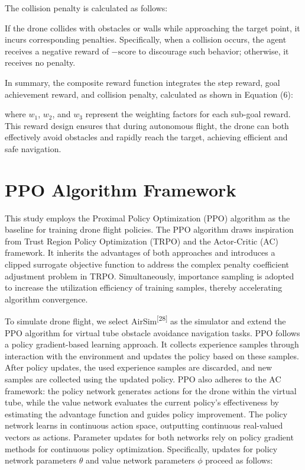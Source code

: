 \documentclass{aas}
\begin{document}
The collision penalty is calculated as follows:


If the drone collides with obstacles or walls while approaching the target point, it incurs corresponding penalties. Specifically, when a collision occurs, the agent receives a negative reward of \(-\text{score}\) to discourage such behavior; otherwise, it receives no penalty.

In summary, the composite reward function integrates the step reward, goal achievement reward, and collision penalty, calculated as shown in Equation (6):


where \( w_1 \), \( w_2 \), and \( w_3 \) represent the weighting factors for each sub-goal reward. This reward design ensures that during autonomous flight, the drone can both effectively avoid obstacles and rapidly reach the target, achieving efficient and safe navigation.

\section{PPO Algorithm Framework}

This study employs the Proximal Policy Optimization (PPO) algorithm as the baseline for training drone flight policies. The PPO algorithm draws inspiration from Trust Region Policy Optimization (TRPO) and the Actor-Critic (AC) framework. It inherits the advantages of both approaches and introduces a clipped surrogate objective function to address the complex penalty coefficient adjustment problem in TRPO. Simultaneously, importance sampling is adopted to increase the utilization efficiency of training samples, thereby accelerating algorithm convergence.

To simulate drone flight, we select AirSim\textsuperscript{[28]} as the simulator and extend the PPO algorithm for virtual tube obstacle avoidance navigation tasks. PPO follows a policy gradient-based learning approach. It collects experience samples through interaction with the environment and updates the policy based on these samples. After policy updates, the used experience samples are discarded, and new samples are collected using the updated policy. PPO also adheres to the AC framework: the policy network generates actions for the drone within the virtual tube, while the value network evaluates the current policy's effectiveness by estimating the advantage function and guides policy improvement. The policy network learns in continuous action space, outputting continuous real-valued vectors as actions. Parameter updates for both networks rely on policy gradient methods for continuous policy optimization. Specifically, updates for policy network parameters \(\theta\) and value network parameters \(\phi\) proceed as follows:
\end{document}
